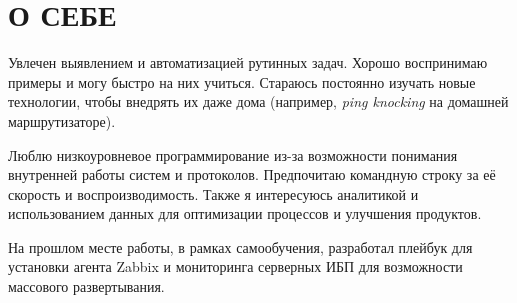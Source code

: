 \section{О СЕБЕ}

Увлечен выявлением и автоматизацией рутинных задач. Хорошо воспринимаю
примеры и могу быстро на них учиться. Стараюсь постоянно изучать новые
технологии, чтобы внедрять их даже дома (например, \textit{ping
  knocking} на домашней маршрутизаторе).

Люблю низкоуровневое программирование из-за возможности понимания
внутренней работы систем и протоколов. Предпочитаю командную строку за
её скорость и воспроизводимость. Также я интересуюсь аналитикой и
использованием данных для оптимизации процессов и улучшения продуктов.

На прошлом месте работы, в рамках самообучения, разработал плейбук для
установки агента Zabbix и мониторинга серверных ИБП для возможности
массового развертывания.


